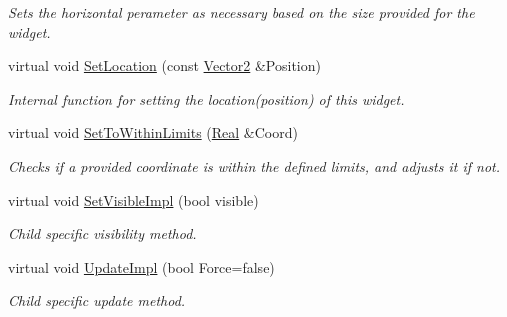 \begin{DoxyCompactItemize}
\begin{DoxyCompactList}\small\item\em Sets the horizontal perameter as necessary based on the size provided for the widget. \item\end{DoxyCompactList}\item 
\hypertarget{classMezzanine_1_1UI_1_1Scrollbar_a0273258fc9c04a286a0750daab6e6479}{
virtual void \hyperlink{classMezzanine_1_1UI_1_1Scrollbar_a0273258fc9c04a286a0750daab6e6479}{SetLocation} (const \hyperlink{classMezzanine_1_1Vector2}{Vector2} \&Position)}
\label{classMezzanine_1_1UI_1_1Scrollbar_a0273258fc9c04a286a0750daab6e6479}

\begin{DoxyCompactList}\small\item\em Internal function for setting the location(position) of this widget. \item\end{DoxyCompactList}\item 
\hypertarget{classMezzanine_1_1UI_1_1Scrollbar_a8cd4502bd47c7ccddd32ca0fca0fce00}{
virtual void \hyperlink{classMezzanine_1_1UI_1_1Scrollbar_a8cd4502bd47c7ccddd32ca0fca0fce00}{SetToWithinLimits} (\hyperlink{namespaceMezzanine_a726731b1a7df72bf3583e4a97282c6f6}{Real} \&Coord)}
\label{classMezzanine_1_1UI_1_1Scrollbar_a8cd4502bd47c7ccddd32ca0fca0fce00}

\begin{DoxyCompactList}\small\item\em Checks if a provided coordinate is within the defined limits, and adjusts it if not. \item\end{DoxyCompactList}\item 
\hypertarget{classMezzanine_1_1UI_1_1Scrollbar_abd93cf6afb98a76ff430883d67dd8206}{
virtual void \hyperlink{classMezzanine_1_1UI_1_1Scrollbar_abd93cf6afb98a76ff430883d67dd8206}{SetVisibleImpl} (bool visible)}
\label{classMezzanine_1_1UI_1_1Scrollbar_abd93cf6afb98a76ff430883d67dd8206}

\begin{DoxyCompactList}\small\item\em Child specific visibility method. \item\end{DoxyCompactList}\item 
\hypertarget{classMezzanine_1_1UI_1_1Scrollbar_a4384c7f9ba20fa3834b2a6992b9be006}{
virtual void \hyperlink{classMezzanine_1_1UI_1_1Scrollbar_a4384c7f9ba20fa3834b2a6992b9be006}{UpdateImpl} (bool Force=false)}
\label{classMezzanine_1_1UI_1_1Scrollbar_a4384c7f9ba20fa3834b2a6992b9be006}

\begin{DoxyCompactList}\small\item\em Child specific update method. \item\end{DoxyCompactList}\end{DoxyCompactItemize}
